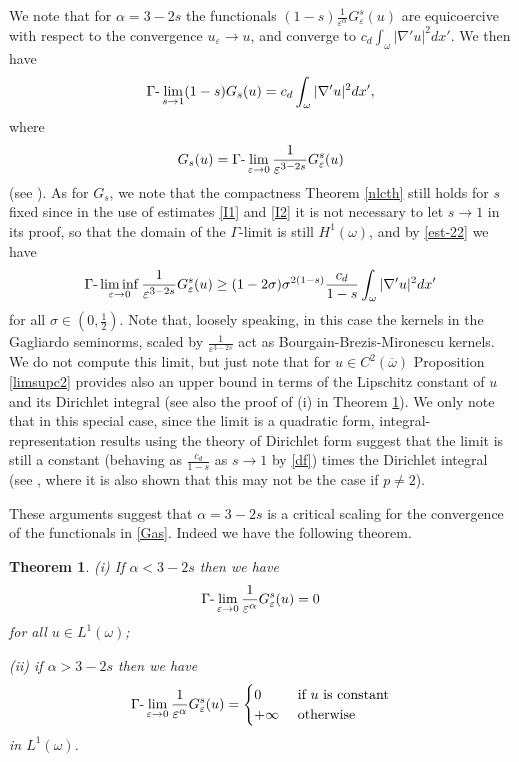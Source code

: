 \documentclass{article}
\newtheorem{theorem}[lemma]{Theorem}
\newcommand{\e}{\varepsilon}
\begin{document}
We note that for $\alpha=3-2s$ the functionals $(1-s)\frac1{\e^\alpha} G^s_\e(u)$ are equicoercive with respect to the convergence $u_\e\to u$,
and converge to $c_d\int_\omega|\nabla' u|^2dx'$. We then have 
\begin{equation}\label{df}
\Gamma\hbox{-}\lim_{s\to 1}(1-s)G_s(u)=c_d\int_\omega|\nabla' u|^2dx',
\end{equation}
where
$$
G_s(u)=\Gamma\hbox{-}\lim_{\e\to 0}\frac1{\e^{3-2s}} G^s_\e(u)
$$
(see \cite{DM,B-LN2}).
As for $G_s$, we note that the compactness Theorem \ref{nlcth} still holds for $s$ fixed since in the use of estimates \eqref{I1} and \eqref{I2} it is not necessary to let $s\to 1$ in its proof, so that the domain of the $\Gamma$-limit is still $H^1(\omega)$, and  by \eqref{est-22} we have
\begin{equation}\label{crit-lb}
\Gamma\hbox{-}\liminf_{\e\to 0}\frac1{\e^{3-2s}} G^s_\e(u)\ge (1-2\sigma)\sigma^{2(1-s)}\frac{c_d}{1-s}\int_\omega|\nabla'u|^2dx'
\end{equation}
for all $\sigma\in(0,\frac12)$. Note that, loosely speaking, in this case the kernels in the Gagliardo seminorms, scaled by $\frac1{\e^{3-2s}}$ act as Bourgain-Brezis-Mironescu kernels. We do not compute this limit, but just note that for $u\in C^2(\overline\omega)$ Proposition \ref{limsupc2} provides also an upper bound in terms of the Lipschitz constant of $u$ and its Dirichlet integral (see also the proof of (i) in Theorem \ref{ftf-th}). We only note that in this special case, since the limit is a quadratic form, integral-representation results using the theory of Dirichlet form suggest that the limit is still a constant (behaving as $\frac{c_d}{1-s}$ as $s\to 1$ by \eqref{df}) times the Dirichlet integral  (see \cite{MR4690560}, where it is also shown that this may not be the case if $p\neq 2$). 

\smallskip
These arguments suggest that $\alpha=3-2s$ is a critical scaling for the convergence of the functionals in \eqref{Gas}. Indeed we have the following theorem.


\begin{theorem}\label{ftf-th}
{\rm(i)} If $\alpha< 3-2s$ then we have 
$$
\Gamma\hbox{-}\lim_{\e\to 0} \frac1{\e^\alpha}G^s_\e(u)=0
$$
for all $u\in L^1(\omega)$;

{\rm(ii)} if  $\alpha> 3-2s$ then we have 
$$
\Gamma\hbox{-}\lim_{\e\to 0} \frac1{\e^\alpha}G^s_\e(u)=\begin{cases}0& \hbox{ if $u$ is constant}\\
+\infty & \hbox{ otherwise}\end{cases}
$$
in $L^1(\omega)$.

\end{theorem}
\end{document}
